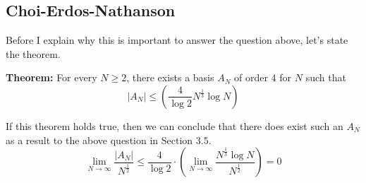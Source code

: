 \subsection{Choi-Erdos-Nathanson}
Before I explain why this is important to answer the question above, let's state the theorem. 
\begin{boxedsection}
    \textbf{Theorem:} For every $N \geq 2$, there exists a basis $A_N$ of order $4$ for $N$ such that
    $$
    |A_N| \leq \left(\frac{4}{\log 2}N^{\frac{1}{3}} \log N\right) 
    $$
\end{boxedsection}
If this theorem holds true, then we can conclude that there does exist such an $A_N$ as a result to the above question in Section $3.5$.
$$
\lim_{N\rightarrow\infty} \frac{|A_N|}{N^{\frac{1}{2}}} \leq \frac{4}{\log 2} \cdot \left( \lim_{N\rightarrow\infty}  \frac{N^{\frac{1}{3}} \log N }{N^{\frac{1}{2}}} \right) = 0 
$$
